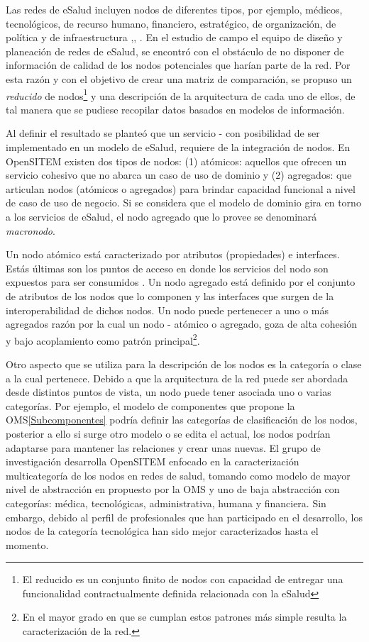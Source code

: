 Las redes de eSalud incluyen nodos de diferentes tipos, por ejemplo, médicos, tecnológicos, de recurso humano, financiero, estratégico, de organización, de política y de infraestructura \cite{ops2011},\cite{oms2016}, \cite{ituoms2012}. En el estudio de campo el equipo de diseño y planeación de redes de eSalud, se encontró con el obstáculo de no disponer de información de calidad de los nodos potenciales que harían parte de la red. Por esta razón y con el objetivo de crear una matriz de comparación, se propuso un \textit{reducido} de nodos\footnote{El reducido es un conjunto finito de nodos con capacidad de entregar una funcionalidad contractualmente definida relacionada con la eSalud} y una descripción de la arquitectura de cada uno de ellos, de tal manera que se pudiese recopilar datos basados en modelos de información.

Al definir el resultado se planteó que un servicio - con posibilidad de ser implementado en un modelo de eSalud, requiere de la integración de nodos. En OpenSITEM existen dos tipos de nodos: (1) atómicos: aquellos que ofrecen un servicio cohesivo que no abarca un caso de uso de dominio  y (2) agregados: que articulan nodos (atómicos o agregados) para brindar capacidad funcional a nivel de caso de uso de negocio. Si se considera que el modelo de dominio gira en torno a los servicios de eSalud, el nodo agregado que lo provee se denominará \textit{macronodo}.

Un nodo atómico está caracterizado por atributos (propiedades) e interfaces. Estás últimas son los puntos de acceso en donde los servicios del nodo son expuestos para ser consumidos \cite{theopengroup2016}. Un nodo agregado está definido por el conjunto de atributos de los nodos que lo componen y las interfaces que surgen de la interoperabilidad de dichos nodos. Un nodo puede pertenecer a uno o más agregados razón por la cual un nodo - atómico o agregado, goza de alta cohesión y bajo acoplamiento como patrón principal\footnote{En el mayor grado en que se cumplan estos patrones más simple resulta la caracterización de la red.}.

Otro aspecto que se utiliza para la descripción de los nodos es la categoría o clase a la cual pertenece. Debido a que la arquitectura de la red puede ser abordada desde distintos puntos de vista, un nodo puede tener asociada uno o varias categorías. Por ejemplo, el modelo de componentes que propone la OMS\ref{Subcomponentes} podría definir las categorías de clasificación de los nodos, posterior a ello si surge otro modelo o se edita el actual, los nodos podrían adaptarse para mantener las relaciones y crear unas nuevas. El grupo de investigación desarrolla OpenSITEM enfocado en la caracterización multicategoría de los nodos en redes de salud, tomando como modelo de mayor nivel de abstracción en propuesto por la OMS y uno de baja abstracción con categorías: médica, tecnológicas, administrativa, humana y financiera. Sin embargo, debido al perfil de profesionales que han participado en el desarrollo, los nodos de la categoría tecnológica han sido mejor caracterizados hasta el momento.

